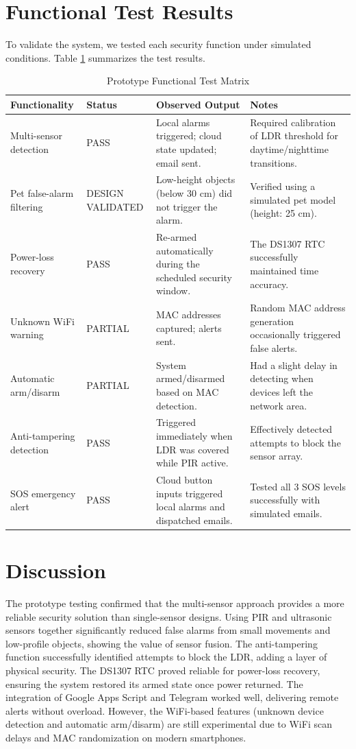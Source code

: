 \documentclass[11pt,a4paper]{report}
\begin{document}
\section{Functional Test Results}
To validate the system, we tested each security function under simulated conditions. Table \ref{tab:test_results} summarizes the test results.
\begin{table}[H]
\centering
\caption{Prototype Functional Test Matrix}
\label{tab:test_results}
\begin{tabular}{lllp{6cm}}
    \toprule
    \textbf{Functionality} & \textbf{Status} & \textbf{Observed Output} & \textbf{Notes} \\
    \midrule
    Multi-sensor detection & PASS & Local alarms triggered; cloud state updated; email sent. & Required calibration of LDR threshold for daytime/nighttime transitions. \\
    Pet false-alarm filtering & DESIGN VALIDATED & Low-height objects (below 30 cm) did not trigger the alarm. & Verified using a simulated pet model (height: 25 cm). \\
    Power-loss recovery & PASS & Re-armed automatically during the scheduled security window. & The DS1307 RTC successfully maintained time accuracy. \\
    Unknown WiFi warning & PARTIAL & MAC addresses captured; alerts sent. & Random MAC address generation occasionally triggered false alerts. \\
    Automatic arm/disarm & PARTIAL & System armed/disarmed based on MAC detection. & Had a slight delay in detecting when devices left the network area. \\
    Anti-tampering detection & PASS & Triggered immediately when LDR was covered while PIR active. & Effectively detected attempts to block the sensor array. \\
    SOS emergency alert & PASS & Cloud button inputs triggered local alarms and dispatched emails. & Tested all 3 SOS levels successfully with simulated emails. \\
    \bottomrule
\end{tabular}
\end{table}
\section{Discussion}
The prototype testing confirmed that the multi-sensor approach provides a more reliable security solution than single-sensor designs. Using PIR and ultrasonic sensors together significantly reduced false alarms from small movements and low-profile objects, showing the value of sensor fusion. The anti-tampering function successfully identified attempts to block the LDR, adding a layer of physical security.
The DS1307 RTC proved reliable for power-loss recovery, ensuring the system restored its armed state once power returned. The integration of Google Apps Script and Telegram worked well, delivering remote alerts without overload. However, the WiFi-based features (unknown device detection and automatic arm/disarm) are still experimental due to WiFi scan delays and MAC randomization on modern smartphones.
\end{document}
